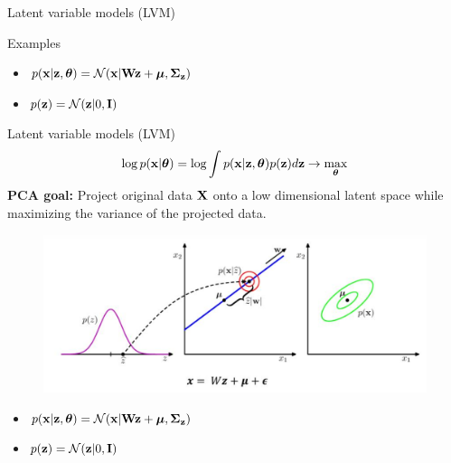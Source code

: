 \begin{frame}{Latent variable models (LVM)}
\begin{block}{Examples}
\begin{minipage}[t]{0.53\columnwidth}
\begin{figure}
		\end{figure}
		\vspace{-0.5cm}
		\begin{itemize}
	        \item $p(\mathbf{x} | \mathbf{z}, \boldsymbol{\theta}) = \mathcal{N}(\mathbf{x} | \mathbf{W} \mathbf{z} + \boldsymbol{\mu}, \boldsymbol{\Sigma}_{\mathbf{z}})$
	        \item $p(\mathbf{z}) = \mathcal{N}(\mathbf{z} | 0, \mathbf{I})$
	    \end{itemize}
	\end{minipage}
	\end{block}
\end{frame}
\begin{frame}{Latent variable models (LVM)}
    \[
    \log p(\mathbf{x} | \boldsymbol{\theta}) = \log \int p(\mathbf{x} | \mathbf{z}, \boldsymbol{\theta}) p(\mathbf{z}) d\mathbf{z} \rightarrow \max_{\boldsymbol{\theta}}
    \]
	\textbf{PCA goal:} Project original data $\mathbf{X}$ onto a low dimensional latent space while maximizing the variance of the projected data. 
	\begin{figure}
		\centering
		\includegraphics[width=.7\linewidth]{figs/bayesian_pca.png}
	\end{figure}
	\vspace{-0.5cm}
	\begin{itemize}
        \item $p(\mathbf{x} | \mathbf{z}, \boldsymbol{\theta}) = \mathcal{N}(\mathbf{x} | \mathbf{W} \mathbf{z} + \boldsymbol{\mu}, \boldsymbol{\Sigma}_{\mathbf{z}})$
        \item $p(\mathbf{z}) = \mathcal{N}(\mathbf{z} | 0, \mathbf{I})$
    \end{itemize}
    
    
\end{frame}
